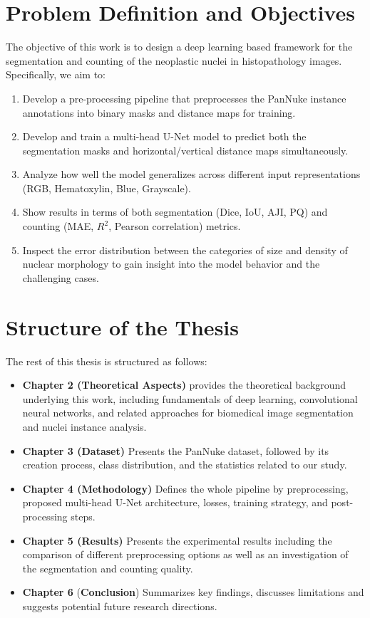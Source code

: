 \documentclass[target=bach,aauheader=,style=]{thud}
\begin{document}
\section{Problem Definition and Objectives}
The objective of this work is to design a deep learning based framework for the segmentation and counting of the neoplastic nuclei in histopathology images. Specifically, we aim to:
\begin{enumerate}
\item Develop a pre-processing pipeline that preprocesses the PanNuke instance annotations into binary masks and distance maps for training.
\item Develop and train a multi-head U-Net model to predict both the segmentation masks and horizontal/vertical distance maps simultaneously.
\item Analyze how well the model generalizes across different input representations (RGB, Hematoxylin, Blue, Grayscale).
\item Show results in terms of both segmentation (Dice, IoU, AJI, PQ) and counting (MAE, $R^2$, Pearson correlation) metrics.
\item Inspect the error distribution between the categories of size and density of nuclear morphology to gain insight into the model behavior and the challenging cases.
\end{enumerate}

\section{Structure of the Thesis}
The rest of this thesis is structured as follows:
\begin{itemize}
\item \textbf{Chapter 2 (Theoretical Aspects)} provides the theoretical background underlying this work, including fundamentals of deep learning, convolutional neural networks, and related approaches for biomedical image segmentation and nuclei instance analysis.
\item \textbf{Chapter 3 (Dataset)} Presents the PanNuke dataset, followed by its creation process, class distribution, and the statistics related to our study.
\item \textbf{Chapter 4 (Methodology)} Defines the whole pipeline by preprocessing, proposed multi-head U-Net architecture, losses, training strategy, and post-processing steps.
\item \textbf{Chapter 5 (Results)} Presents the experimental results including the comparison of different preprocessing options as well as an investigation of the segmentation and counting quality.
\item \textbf{Chapter 6} (\textbf{Conclusion}) Summarizes key findings, discusses limitations and suggests potential future research directions.
\end{itemize}
\end{document}
